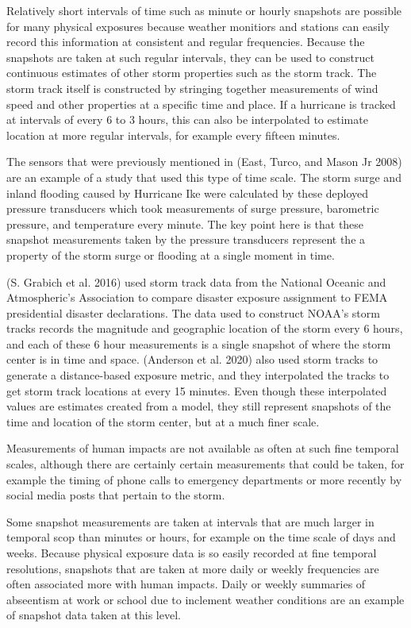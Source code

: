 \documentclass[
]{article}
\begin{document}
Relatively short intervals of time such as minute or hourly snapshots
are possible for many physical exposures because weather monitiors and
stations can easily record this information at consistent and regular
frequencies. Because the snapshots are taken at such regular intervals,
they can be used to construct continuous estimates of other storm
properties such as the storm track. The storm track itself is
constructed by stringing together measurements of wind speed and other
properties at a specific time and place. If a hurricane is tracked at
intervals of every 6 to 3 hours, this can also be interpolated to
estimate location at more regular intervals, for example every fifteen
minutes.

The sensors that were previously mentioned in (East, Turco, and Mason Jr
2008) are an example of a study that used this type of time scale. The
storm surge and inland flooding caused by Hurricane Ike were calculated
by these deployed pressure transducers which took measurements of surge
pressure, barometric pressure, and temperature every minute. The key
point here is that these snapshot measurements taken by the pressure
transducers represent the a property of the storm surge or flooding at a
single moment in time.

(S. Grabich et al. 2016) used storm track data from the National Oceanic
and Atmospheric's Association to compare disaster exposure assignment to
FEMA presidential disaster declarations. The data used to construct
NOAA's storm tracks records the magnitude and geographic location of the
storm every 6 hours, and each of these 6 hour measurements is a single
snapshot of where the storm center is in time and space. (Anderson et
al. 2020) also used storm tracks to generate a distance-based exposure
metric, and they interpolated the tracks to get storm track locations at
every 15 minutes. Even though these interpolated values are estimates
created from a model, they still represent snapshots of the time and
location of the storm center, but at a much finer scale.

Measurements of human impacts are not available as often at such fine
temporal scales, although there are certainly certain measurements that
could be taken, for example the timing of phone calls to emergency
departments or more recently by social media posts that pertain to the
storm.

Some snapshot measurements are taken at intervals that are much larger
in temporal scop than minutes or hours, for example on the time scale of
days and weeks. Because physical exposure data is so easily recorded at
fine temporal resolutions, snapshots that are taken at more daily or
weekly frequencies are often associated more with human impacts. Daily
or weekly summaries of abseentism at work or school due to inclement
weather conditions are an example of snapshot data taken at this level.
\end{document}
